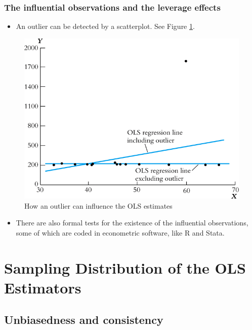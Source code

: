\documentclass[a4paper,11pt]{article}
\begin{document}
\subsubsection*{The influential observations and the leverage effects}
\label{sec:org9db237b}

\begin{itemize}
\item An outlier can be detected by a scatterplot. See Figure \ref{fig:orgbef66fd}.
\end{itemize}

\begin{figure}[htbp]
\centering
\includegraphics[width=.9\linewidth]{img/fig-4-5.png}
\caption{\label{fig:orgbef66fd}
How an outlier can influence the OLS estimates}
\end{figure}

\begin{itemize}
\item There are also formal tests for the existence of the influential
observations, some of which are coded in econometric software, like
R and Stata.
\end{itemize}



\section{Sampling Distribution of the OLS Estimators}
\label{sec:org94c3699}
\subsection{Unbiasedness and consistency}
\label{sec:org13baf04}
\end{document}
